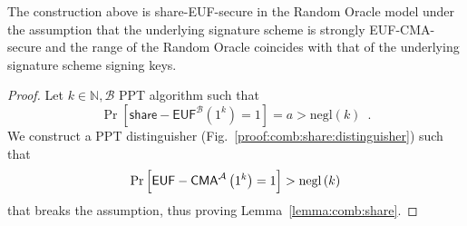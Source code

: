    \begin{lemma}
      \label{lemma:comb:share}
      The construction above is \textsf{share-EUF}-secure in the Random Oracle
      model under the assumption that the underlying signature scheme is
      strongly \textsf{EUF-CMA}-secure and the range of the Random Oracle
      coincides with that of the underlying signature scheme signing keys.
    \end{lemma}

    \begin{proof}
      Let $k \in \mathbb{N}, \mathcal{B}$ PPT algorithm such that
      \begin{equation*}
        \Pr\left[\mathsf{share-EUF}^{\mathcal{B}}\left(1^k\right) = 1\right] = a
        > \mathrm{negl}\left(k\right) \enspace.
      \end{equation*}
      We construct a PPT distinguisher \adversary{}
      (Fig.~\ref{proof:comb:share:distinguisher}) such that
      \begin{equation*}
        \Pr\left[\mathsf{EUF-CMA}^{\mathcal{A}}\left(1^k\right) = 1\right] >
        \mathrm{negl}\left(k\right)
      \end{equation*}
      that breaks the assumption, thus proving Lemma~\ref{lemma:comb:share}.


\end{proof}
